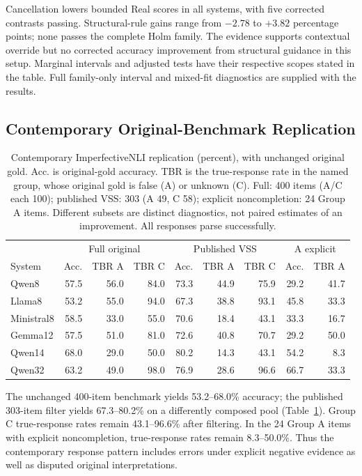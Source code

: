\documentclass[sigconf,anonymous,review]{acmart}
\begin{document}
Cancellation lowers bounded Real scores in all systems, with five corrected contrasts passing. Structural-rule gains range from $-2.78$ to $+3.82$ percentage points; none passes the complete Holm family. The evidence supports contextual override but no corrected accuracy improvement from structural guidance in this setup. Marginal intervals and adjusted tests have their respective scopes stated in the table. Full family-only interval and mixed-fit diagnostics are supplied with the results.

\subsection{Contemporary Original-Benchmark Replication}
\begin{table}[t]
\centering
\caption{Contemporary ImperfectiveNLI replication (percent), with unchanged original gold. Acc. is original-gold accuracy. TBR is the true-response rate in the named group, whose original gold is false (A) or unknown (C). Full: 400 items (A/C each 100); published VSS: 303 (A 49, C 58); explicit noncompletion: 24 Group A items. Different subsets are distinct diagnostics, not paired estimates of an improvement. All responses parse successfully.}
\label{tab:replication_results}
\setlength{\tabcolsep}{5pt}
\begin{tabular}{lrrrrrrrr}
\toprule
 & \multicolumn{3}{c}{Full original} & \multicolumn{3}{c}{Published VSS} & \multicolumn{2}{c}{A explicit}\\
System & Acc. & TBR A & TBR C & Acc. & TBR A & TBR C & Acc. & TBR A\\
\midrule
Qwen8 & 57.5 & 56.0 & 84.0 & 73.3 & 44.9 & 75.9 & 29.2 & 41.7 \\
Llama8 & 53.2 & 55.0 & 94.0 & 67.3 & 38.8 & 93.1 & 45.8 & 33.3 \\
Ministral8 & 58.5 & 33.0 & 55.0 & 70.6 & 18.4 & 43.1 & 33.3 & 16.7 \\
Gemma12 & 57.5 & 51.0 & 81.0 & 72.6 & 40.8 & 70.7 & 29.2 & 50.0 \\
Qwen14 & 68.0 & 29.0 & 50.0 & 80.2 & 14.3 & 43.1 & 54.2 & 8.3 \\
Qwen32 & 63.2 & 49.0 & 98.0 & 76.9 & 28.6 & 96.6 & 66.7 & 33.3 \\
\bottomrule
\end{tabular}
\end{table}
The unchanged 400-item benchmark yields 53.2--68.0\% accuracy; the published 303-item filter yields 67.3--80.2\% on a differently composed pool (Table~\ref{tab:replication_results}). Group C true-response rates remain 43.1--96.6\% after filtering. In the 24 Group A items with explicit noncompletion, true-response rates remain 8.3--50.0\%. Thus the contemporary response pattern includes errors under explicit negative evidence as well as disputed original interpretations.
\end{document}
